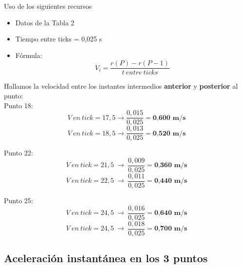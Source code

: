 \documentclass[10pt]{article}
\begin{document}
Uso de los siguientes recursos
\begin{itemize}
    \item Datos de la Tabla 2
    \item Tiempo entre ticks = 0,025 s
    \item Fórmula:
    \large{\begin{equation}
        V_{i} = \frac{r(P) - r(P-1)}{t~entre~ticks}
    \end{equation}}
\end{itemize}

\vspace{0,2cm}
Hallamos la velocidad entre los instantes intermedios \textbf{anterior} y \textbf{posterior} al punto:\\

Punto 18:
 \begin{equation*}
    V~en~tick = 17,5 \longrightarrow \frac{0,015}{0,025} = \textbf{0,600~m/s}
\end{equation*}
\vspace{0,1cm}
 \begin{equation*}
    V~en~tick = 18,5 \longrightarrow \frac{0,013}{0,025} = \textbf{0,520~m/s}
\end{equation*}

\vspace{0,25cm}
Punto 22:
 \begin{equation*}
    V~en~tick = 21,5 ~ \longrightarrow~ \frac{0,009}{0,025} = \textbf{0,360~m/s}
\end{equation*}
\vspace{0,1cm}
 \begin{equation*}
    V~en~tick = 22,5 ~ \longrightarrow ~ \frac{0,011}{0,025} = \textbf{0,440~m/s}
\end{equation*}

\vspace{0,25cm}
Punto 25:
 \begin{equation*}
    V~en~tick = 24,5 ~ \longrightarrow ~ \frac{0,016}{0,025} = \textbf{0,640~m/s}
\end{equation*}
\vspace{0,1cm}
 \begin{equation*}
    V~en~tick = 24,5 ~ \longrightarrow ~ \frac{0,018}{0,025} = \textbf{0,700~m/s}
\end{equation*}
\vspace{-1mm}

\subsection{Aceleración instantánea en los 3 puntos}\vspace{2mm}
\end{document}
